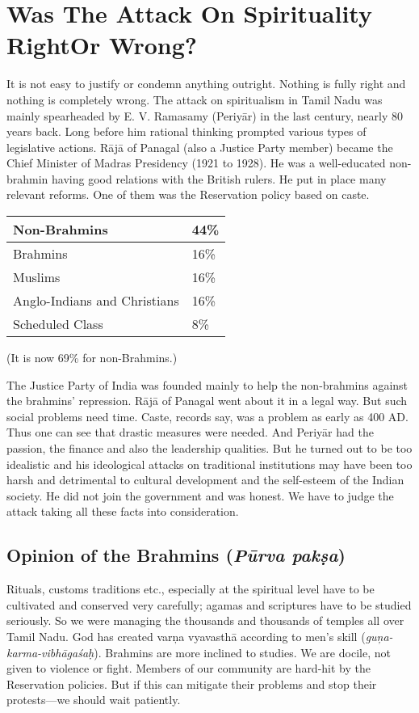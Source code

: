 \section*{Was The Attack On Spirituality Right\hfill \break Or Wrong?}

It is not easy to justify or condemn anything outright. Nothing is fully right and nothing is completely wrong. The attack on spiritualism in Tamil Nadu was mainly spearheaded by E. V. Ramasamy (Periyār) in the last century, nearly 80 years back. Long before him rational thinking prompted various types of legislative actions. Rājā of Panagal (also a Justice Party member) became the Chief Minister of Madras Presidency (1921 to 1928). He was a well-educated non-brahmin having good relations with the British rulers. He put in place many relevant reforms. One of them was the Reservation policy based on caste.

\begin{longtable}{@{}|l|l|@{}}
\hline
Non-Brahmins & 44\% \\
\hline
Brahmins & 16\% \\
\hline
Muslims & 16\% \\
\hline
Anglo-Indians and Christians & 16\% \\
\hline
Scheduled Class & 8\% \\
\hline
\end{longtable}

(It is now 69\% for non-Brahmins.)

The Justice Party of India was founded mainly to help the non-brahmins against the brahmins’ repression. Rājā of Panagal went about it in a legal way. But such social problems need time. Caste, records say, was a problem as early as 400 AD. Thus one can see that drastic measures were needed. And Periyār had the passion, the finance and also the leadership qualities. But he turned out to be too idealistic and his ideological attacks on traditional institutions may have been too harsh and detrimental to cultural development and the self-esteem of the Indian society. He did not join the government and was honest. We have to judge the attack taking all these facts into consideration.

\subsection*{Opinion of the Brahmins (\textit{Pūrva pakṣa})}

Rituals, customs traditions etc., especially at the spiritual level have to be cultivated and conserved very carefully; agamas and scriptures have to be studied seriously. So we were managing the thousands and thousands of temples all over Tamil Nadu. God has created varņa vyavasthā according to men’s skill (\textit{guņa-karma-vibhāgaśaḥ}). Brahmins are more inclined to studies. We are docile, not given to violence or fight. Members of our community are hard-hit by the Reservation policies. But if this can mitigate their problems and stop their protests—we should wait patiently.



